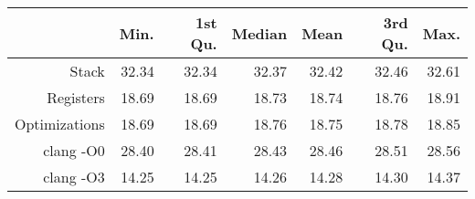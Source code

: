 \begin{table}[ht]
\centering
\begin{tabular}{rrrrrrr}
  \hline
 & Min. & 1st Qu. & Median & Mean & 3rd Qu. & Max. \\ 
  \hline
Stack & 32.34 & 32.34 & 32.37 & 32.42 & 32.46 & 32.61 \\ 
  Registers & 18.69 & 18.69 & 18.73 & 18.74 & 18.76 & 18.91 \\ 
  Optimizations & 18.69 & 18.69 & 18.76 & 18.75 & 18.78 & 18.85 \\ 
  clang -O0 & 28.40 & 28.41 & 28.43 & 28.46 & 28.51 & 28.56 \\ 
  clang -O3 & 14.25 & 14.25 & 14.26 & 14.28 & 14.30 & 14.37 \\ 
   \hline
\end{tabular}
\end{table}
